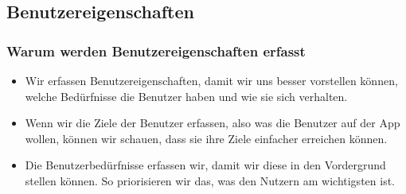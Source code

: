 \documentclass[10pt]{article}
\begin{document}
\subsection{Benutzereigenschaften}
\subsubsection{Warum werden Benutzereigenschaften erfasst}
\begin{itemize}
	\item Wir erfassen Benutzereigenschaften, damit wir uns besser vorstellen können, welche Bedürfnisse die Benutzer haben und wie sie sich verhalten.
	\item Wenn wir die Ziele der Benutzer erfassen, also was die Benutzer auf der App wollen, können wir schauen, dass sie ihre Ziele einfacher erreichen können.\
	\item Die Benutzerbedürfnisse erfassen wir, damit wir diese in den Vordergrund stellen können. So priorisieren wir das, was den Nutzern am wichtigsten ist.
\end{itemize}
\end{document}
